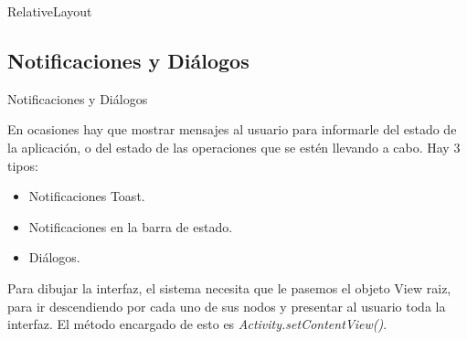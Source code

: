 \begin{frame}[fragile]{RelativeLayout}
    \begin{block}{}
    \end{block}
\end{frame}

\subsection{Notificaciones y Diálogos}
\begin{frame}{Notificaciones y Diálogos}
    \begin{block}{}En ocasiones hay que mostrar mensajes al usuario para
    informarle del estado de la aplicación, o del estado de las operaciones
    que se estén llevando a cabo. Hay 3 tipos:

	\begin{itemize}
		\item {
			Notificaciones Toast.\pause
		}
		\item {
			Notificaciones en la barra de estado.
		}
		\item <3->{
			Diálogos.
		}
	\end{itemize}
Para dibujar la interfaz, el sistema necesita que le pasemos el objeto View raiz, para ir descendiendo por cada uno de sus nodos y presentar al usuario toda la interfaz. El método encargado de esto es \textit{{Activity.setContentView()}}.
    \end{block}
\end{frame}
